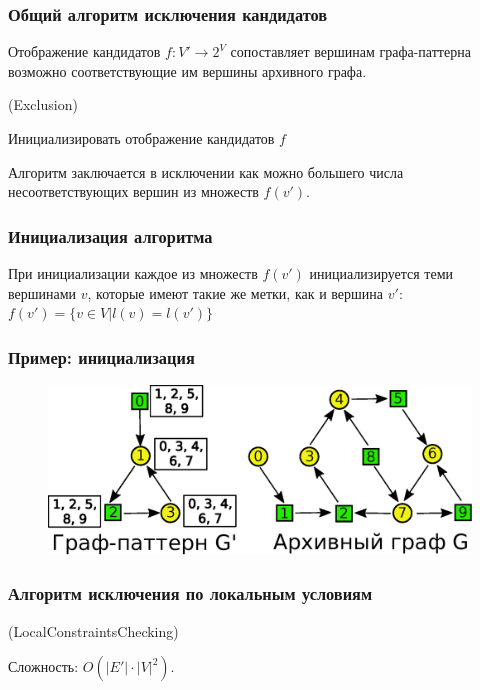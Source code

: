 \documentclass{beamer}
\begin{document}
\begin{frame}
\frametitle{Общий алгоритм исключения кандидатов}

Отображение кандидатов $f : V' \to 2^V$ сопоставляет вершинам графа-паттерна возможно соответствующие им вершины архивного графа.

\begin{algorithm}[H]
	\Begin(Exclusion){		
		Инициализировать отображение кандидатов $f$
		
	}
\end{algorithm}

Алгоритм заключается в исключении как можно большего числа несоответствующих вершин из множеств $f(v')$.

\end{frame}

\begin{frame}
\frametitle{Инициализация алгоритма}
При инициализации каждое из множеств $f(v')$ инициализируется теми вершинами $v$, которые имеют такие же метки, как и вершина $v'$: $f(v') = \{ v \in V | l(v) = l(v')\}$
\end{frame}

\begin{frame}
\frametitle{Пример: инициализация}
\begin{figure}[H]
	\centering
	\includegraphics[width=1\textwidth]{ee9}
	\label{fig:ee9}
\end{figure}
\end{frame}

\begin{frame}
\frametitle{Алгоритм исключения по локальным условиям}
\begin{algorithm}[H]
	\Begin(LocalConstraintsChecking){		
	}
\end{algorithm}

Сложность: $O(|E'|\cdot|V|^2)$.
\end{frame}
\end{document}

